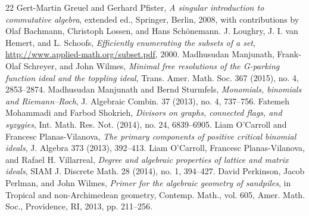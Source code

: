 \documentclass[10pt]{amsart}
\theoremstyle{definition}
\theoremstyle{remark}
\begin{document}
\begin{thebibliography}{22}
 Gert-Martin Greuel and Gerhard Pfister, \emph{A singular introduction to commutative algebra}, extended ed., Springer, Berlin, 2008, with contributions by Olaf Bachmann, Christoph Lossen, and Hans Sch\"{o}nemann.
 J. Loughry, J. I. van Hemert, and L. Schoofs, \emph{Efficiently enumerating the subsets of a set}, \url{http://www.applied-math.org/subset.pdf}, 2000.
 Madhusudan Manjunath, Frank-Olaf Schreyer, and John Wilmes, \emph{Minimal free resolutions of the G-parking function ideal and the toppling ideal}, Trans. Amer. Math. Soc. 367 (2015), no. 4, 2853--2874.
 Madhusudan Manjunath and Bernd Sturmfels, \emph{Monomials, binomials and Riemann--Roch}, J. Algebraic Combin. 37 (2013), no. 4, 737--756.
 Fatemeh Mohammadi and Farbod Shokrieh, \emph{Divisors on graphs, connected flags, and syzygies}, Int. Math. Res. Not. (2014), no. 24, 6839--6905.
 Liam O'Carroll and Francesc Planas-Vilanova, \emph{The primary components of positive critical binomial ideals}, J. Algebra 373 (2013), 392--413.
 Liam O'Carroll, Francesc Planas-Vilanova, and Rafael H. Villarreal, \emph{Degree and algebraic properties of lattice and matrix ideals}, SIAM J. Discrete Math. 28 (2014), no. 1, 394--427.
 David Perkinson, Jacob Perlman, and John Wilmes, \emph{Primer for the algebraic geometry of sandpiles}, in Tropical and non-Archimedean geometry, Contemp. Math., vol. 605, Amer. Math. Soc., Providence, RI, 2013, pp. 211--256.
\end{thebibliography}
\end{document}
